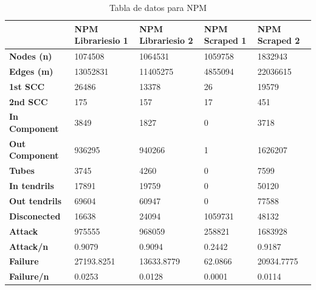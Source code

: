\begin{table}[h!]
    \centering
    \tiny
    \label{tab:data_npm}
    \begin{tabular}{|l|l|l|l|l|}
        \hline
                               & \textbf{NPM Librariesio 1} & \textbf{NPM Librariesio 2} & \textbf{NPM Scraped 1} & \textbf{NPM Scraped 2} \\
        \hline
        \textbf{Nodes (n)}     & 1074508                    & 1064531                    & 1059758                & 1832943                \\
        \textbf{Edges (m)}     & 13052831                   & 11405275                   & 4855094                & 22036615               \\
        \textbf{1st SCC}       & 26486                      & 13378                      & 26                     & 19579                  \\
        \textbf{2nd SCC}       & 175                        & 157                        & 17                     & 451                    \\
        \textbf{In Component}  & 3849                       & 1827                       & 0                      & 3718                   \\
        \textbf{Out Component} & 936295                     & 940266                     & 1                      & 1626207                \\
        \textbf{Tubes}         & 3745                       & 4260                       & 0                      & 7599                   \\
        \textbf{In tendrils}   & 17891                      & 19759                      & 0                      & 50120                  \\
        \textbf{Out tendrils}  & 69604                      & 60947                      & 0                      & 77588                  \\
        \textbf{Disconected}   & 16638                      & 24094                      & 1059731                & 48132                  \\
        \textbf{Attack}        & 975555                     & 968059                     & 258821                 & 1683928                \\
        \textbf{Attack/n}      & 0.9079                     & 0.9094                     & 0.2442                 & 0.9187                 \\
        \textbf{Failure}       & 27193.8251                 & 13633.8779                 & 62.0866                & 20934.7775             \\
        \textbf{Failure/n}     & 0.0253                     & 0.0128                     & 0.0001                 & 0.0114                 \\
        \hline
    \end{tabular}
    \caption{Tabla de datos para NPM}
\end{table}


